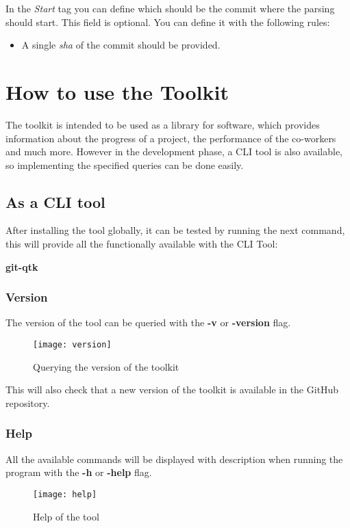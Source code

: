 In the \textit{Start} tag you can define which should be the commit where the parsing should start.
This field is optional.
You can define it with the following rules:

\begin{itemize}
	\item A single \textit{sha} of the commit should be provided.
\end{itemize}

\section{How to use the Toolkit}
The toolkit is intended to be used as a library for software, which provides information about the progress of a project, the performance of the co-workers and much more. However in the development phase, a CLI tool is also available, so implementing the specified queries can be done easily.

\subsection{As a CLI tool}
After installing the tool globally, it can be tested by running the next command, this will provide all the functionally available with the CLI Tool:

\textbf{git-qtk}
\subsubsection{Version}
The version of the tool can be queried with the \textbf{-v} or \textbf{-version} flag.

\begin{figure}[H]
	\centering
	\texttt{[image: version]}
	\caption{Querying the version of the toolkit}
	\label{fig:fig-version}
\end{figure}

This will also check that a new version of the toolkit is available in the GitHub repository\cite{repo}. 

\newpage
\subsubsection{Help}
All the available commands will be displayed with description when running the program with the \textbf{-h} or \textbf{-help} flag.

\begin{figure}[H]
	\centering
	\texttt{[image: help]}
	\caption{Help of the tool}
	\label{fig:fig-help}
\end{figure}

